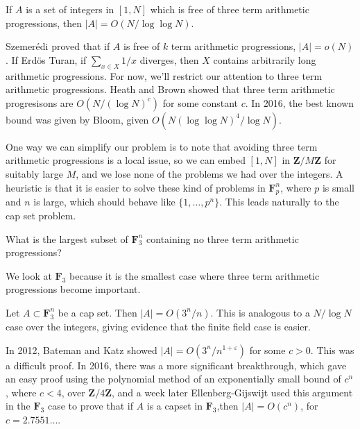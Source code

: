 \begin{theorem}[Roth - 1956] If $A$ is a set of integers in $[1,N]$ which is free of three term arithmetic progressions, then $|A| = O(N/\log \log N)$.
\end{theorem}

Szemer\'{e}di proved that if $A$ is free of $k$ term arithmetic progressions, $|A| = o(N)$. If Erd\"{o}s Turan, if $\sum_{x \in X} 1/x$ diverges, then $X$ contains arbitrarily long arithmetic progressions. For now, we'll restrict our attention to three term arithmetic progressions. Heath and Brown showed that three term arithmetic progresisons are $O(N/(\log N)^c)$ for some constant $c$. In 2016, the best known bound was given by Bloom, given $O(N(\log \log N)^4/\log N)$.

One way we can simplify our problem is to note that avoiding three term arithmetic progressions is a local issue, so we can embed $[1,N]$ in $\mathbf{Z}/M\mathbf{Z}$ for suitably large $M$, and we lose none of the problems we had over the integers. A heuristic is that it is easier to solve these kind of problems in $\mathbf{F}_p^n$, where $p$ is small and $n$ is large, which should behave like $\{ 1, \dots, p^n \}$. This leads naturally to the cap set problem.

\begin{theorem}
	What is the largest subset of $\mathbf{F}_3^n$ containing no three term arithmetic progressions?
\end{theorem}

We look at $\mathbf{F}_3$ because it is the smallest case where three term arithmetic progressions become important.

\begin{theorem}[Meschulam - 1995]
	Let $A \subset \mathbf{F}_3^n$ be a cap set. Then $|A| = O(3^n/n)$. This is analogous to a $N/\log N$ case over the integers, giving evidence that the finite field case is easier.
\end{theorem}

In 2012, Bateman and Katz showed $|A| = O(3^n/n^{1 + \varepsilon})$ for some $c > 0$. This was a difficult proof. In 2016, there was a more significant breakthrough, which gave an easy proof using the polynomial method of an exponentially small bound of $c^n$, where $c < 4$, over $\mathbf{Z}/4\mathbf{Z}$, and a week later Ellenberg-Gijswijt used this argument in the $\mathbf{F}_3$ case to prove that if $A$ is a capset in $\mathbf{F}_3$,then $|A| = O(c^n)$, for $c = 2.7551\dots$.

